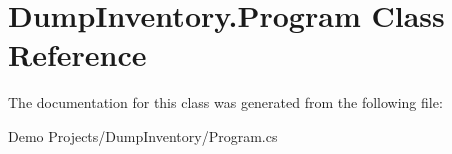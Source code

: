 \hypertarget{class_dump_inventory_1_1_program}{\section{Dump\-Inventory.\-Program Class Reference}
\label{class_dump_inventory_1_1_program}
}


The documentation for this class was generated from the following file\-:\begin{DoxyCompactItemize}
\item 
Demo Projects/\-Dump\-Inventory/Program.\-cs\end{DoxyCompactItemize}
